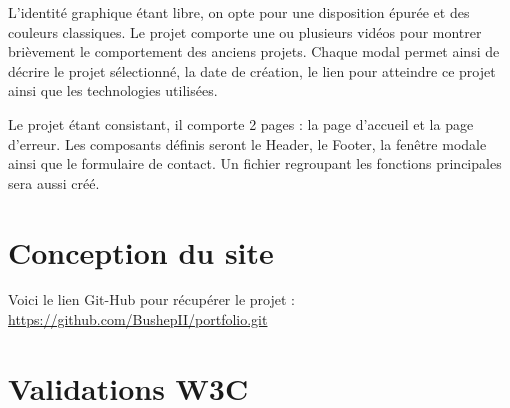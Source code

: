 \documentclass[a4paper, 12pt]{article}
\begin{document}
L'identité graphique étant libre, on opte pour une disposition épurée et des couleurs classiques. Le projet comporte une ou plusieurs vidéos pour montrer brièvement le comportement des anciens projets. Chaque modal permet ainsi de décrire le projet sélectionné, la date de création, le lien pour atteindre ce projet ainsi que les technologies utilisées.

Le projet étant consistant, il comporte 2 pages : la page d'accueil et la page d'erreur. Les composants définis seront le Header, le Footer, la fenêtre modale ainsi que le formulaire de contact. Un fichier regroupant les fonctions principales sera aussi créé.
\section{Conception du site}
Voici le lien Git-Hub pour récupérer le projet : \url{https://github.com/BushepII/portfolio.git}
\section{Validations W3C}
\end{document}
